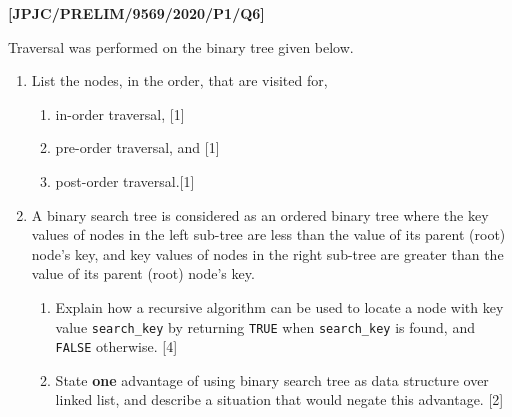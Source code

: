 \item \textbf{{[}JPJC/PRELIM/9569/2020/P1/Q6{]} }

Traversal was performed on the binary tree given below. 
\begin{enumerate}
\item List the nodes, in the order, that are visited for, 
\begin{enumerate}
\item in-order traversal, \hfill{}{[}1{]}
\item pre-order traversal, and \hfill{}{[}1{]}
\item post-order traversal.\hfill{}{[}1{]}
\end{enumerate}
\item A binary search tree is considered as an ordered binary tree where
the key values of nodes in the left sub-tree are less than the value
of its parent (root) node's key, and key values of nodes in the right
sub-tree are greater than the value of its parent (root) node\textquoteright s
key. 
\begin{enumerate}
\item Explain how a recursive algorithm can be used to locate a node with
key value \texttt{search\_key} by returning \texttt{TRUE} when \texttt{search\_key}
is found, and \texttt{FALSE} otherwise. \hfill{}{[}4{]}
\item State \textbf{one} advantage of using binary search tree as data structure
over linked list, and describe a situation that would negate this
advantage.\hfill{} {[}2{]}
\end{enumerate}
\end{enumerate}